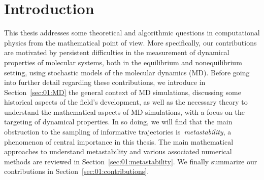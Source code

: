 
\chapter{Introduction}
\label{chap:introduction}
This thesis addresses some theoretical and algorithmic questions in computational physics from the mathematical point of view. More specifically, our contributions are motivated by persistent difficulties in the measurement of dynamical properties of molecular systems, both in the equilibrium and nonequilibrium setting, using stochastic models of the molecular dynamics (MD).
Before going into further detail regarding these contributions, we introduce in Section~\ref{sec:01:MD} the general context of MD simulations, discussing some historical aspects of the field's development, as well as the necessary theory to understand the mathematical aspects of MD simulations, with a focus on the targeting of dynamical properties.
In so doing, we will find that the main obstruction to the sampling of informative trajectories is~\textit{metastability}, a phenomenon of central importance in this thesis. The main mathematical approaches to understand metastability and various associated numerical methods are reviewed in Section~\ref{sec:01:metastability}. We finally summarize our contributions in Section~\ref{sec:01:contributions}.

